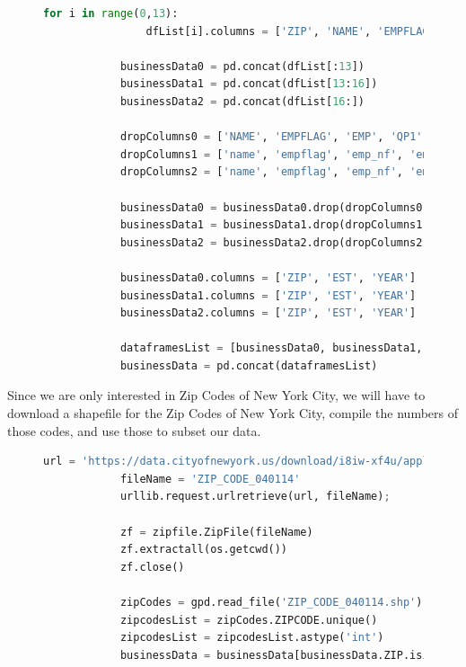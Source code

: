 \documentclass[letter, 11pt]{article} %
\begin{document}
		\begin{figure}[H]
			\centering
			\begin{lstlisting}[language=python]
			for i in range(0,13):
				dfList[i].columns = ['ZIP', 'NAME', 'EMPFLAG', 'EMP', 'QP1', 'AP', 'EST', 'YEAR']
				
			businessData0 = pd.concat(dfList[:13])
			businessData1 = pd.concat(dfList[13:16])
			businessData2 = pd.concat(dfList[16:])
			
			dropColumns0 = ['NAME', 'EMPFLAG', 'EMP', 'QP1', 'AP'] 
			dropColumns1 = ['name', 'empflag', 'emp_nf', 'emp', 'qp1_nf', 'qp1', 'ap_nf', 'ap'] 
			dropColumns2 = ['name', 'empflag', 'emp_nf', 'emp', 'qp1_nf', 'qp1', 'ap_nf', 'ap', 'city', 'stabbr', 'cty_name']
			
			businessData0 = businessData0.drop(dropColumns0, axis=1)
			businessData1 = businessData1.drop(dropColumns1, axis=1)
			businessData2 = businessData2.drop(dropColumns2, axis=1)
			
			businessData0.columns = ['ZIP', 'EST', 'YEAR']
			businessData1.columns = ['ZIP', 'EST', 'YEAR']
			businessData2.columns = ['ZIP', 'EST', 'YEAR']
			
			dataframesList = [businessData0, businessData1, businessData2]
			businessData = pd.concat(dataframesList)	
			\end{lstlisting}
		\end{figure}
	
		\pagebreak
	
		\noindent Since we are only interested in Zip Codes of New York City, we will have to download a shapefile for the Zip Codes of New York City, compile the numbers of those codes, and use those to subset our data. 
		
		\begin{figure}[H]
			\centering
			\begin{lstlisting}[language=python]
			url = 'https://data.cityofnewyork.us/download/i8iw-xf4u/application%2Fzip'
			fileName = 'ZIP_CODE_040114'
			urllib.request.urlretrieve(url, fileName);
			
			zf = zipfile.ZipFile(fileName)
			zf.extractall(os.getcwd())
			zf.close()
			
			zipCodes = gpd.read_file('ZIP_CODE_040114.shp')
			zipcodesList = zipCodes.ZIPCODE.unique()
			zipcodesList = zipcodesList.astype('int')
			businessData = businessData[businessData.ZIP.isin(zipcodesList)]
			\end{lstlisting}
		\end{figure}
	
\end{document}
